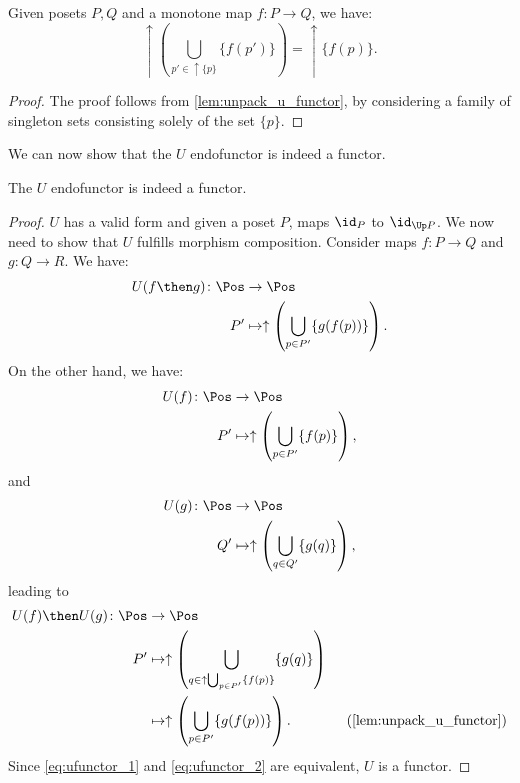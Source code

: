 \begin{lemma}
    \label{lem:unpack_part_2}
    Given posets $P,Q$ and a monotone map $f\colon P\to Q$, we have:
    \begin{equation}
        \uparrow \left( \bigcup_{p'\in \uparrow \{p\}} \{f(p')\}\right)=\uparrow \{f(p)\}.
    \end{equation}
\end{lemma}
\begin{proof}
    The proof follows from \cref{lem:unpack_u_functor}, by considering a family of singleton sets consisting solely of the set $\{p\}$.
\end{proof}
We can now show that the $U$ endofunctor is indeed a functor.
\begin{lemma}
    The $U$ endofunctor is indeed a functor.
\end{lemma}
\begin{proof}
    $U$ has a valid form and given a poset $P$, maps $\id_P$ to $\id_{\Up P}$. We now need to show that $U$ fulfills morphism composition. Consider maps $f\colon P \to Q$ and $g\colon Q \to R$. We have:
    \begin{equation}
        \label{eq:ufunctor_1}
        \begin{aligned}
            U(f\then g)\colon \Pos &\to \Pos\\
            P'&\mapsto \uparrow \left( \bigcup_{p\in P'} \{g(f(p))\}\right).
        \end{aligned}
    \end{equation}
    On the other hand, we have:
    \begin{equation}
        \begin{aligned}
            U(f)\colon \Pos &\to \Pos\\
            P'&\mapsto \uparrow \left( \bigcup_{p\in P'}\{f(p)\}\right),
        \end{aligned}
    \end{equation}
    and
    \begin{equation}
        \begin{aligned}
            U(g)\colon \Pos &\to \Pos\\
            Q'&\mapsto \uparrow \left( \bigcup_{q\in Q'}\{g(q)\}\right),
        \end{aligned}
    \end{equation}
    leading to
    \begin{equation}
        \label{eq:ufunctor_2}
        \begin{aligned}
            U(f)\then U(g)\colon \Pos &\to \Pos\\
            P'&\mapsto \uparrow\left( \bigcup_{q\in \uparrow \bigcup_{p\in P'}\{f(p)\}}\{g(q)\}\right)\\
            &\mapsto \uparrow \left(\bigcup_{p\in P'} \{ g(f(p))\}\right). \qquad \qquad (\cref{lem:unpack_u_functor})
        \end{aligned}
    \end{equation}
    Since \cref{eq:ufunctor_1} and \cref{eq:ufunctor_2} are equivalent, $U$ is a functor.
\end{proof}
